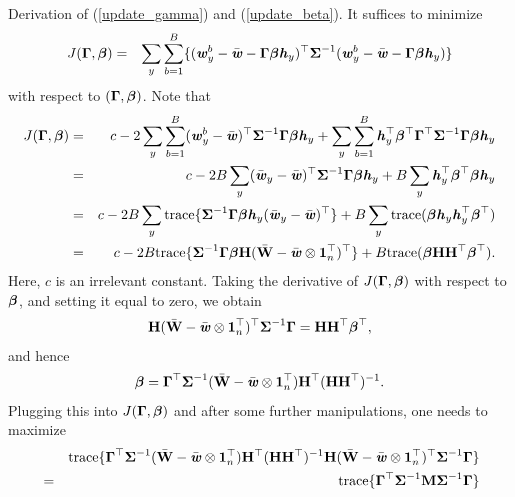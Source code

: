 \documentclass[12pt]{article}
\def \bfith{\mbox{\textbf{\textit{h}}}}
\def \bfitw{\mbox{\textbf{\textit{w}}}}
\def \bfbeta{\mbox{\boldmath $\beta$}}
\def \M{\mathbf{M}}
\def \H{\mathbf{H}}
\def \W{\mathbf{W}}
\def \bfGamma{\mbox{\boldmath $\Gamma$}}
\def \bfSigma{\mbox{\boldmath $\Sigma$}}
\begin{document}
{\sc Derivation of (\ref{update_gamma}) and (\ref{update_beta}).} It suffices to minimize
\begin{eqnarray*}
J(\bfGamma, \bfbeta) &=& \sum_{y} \sum_{b = 1}^{B}\{(\bfitw_{y}^{b} - \bar{\bfitw} - \bfGamma{\bfbeta} \bfith_y)^{\top} \bfSigma^{-1} (\bfitw_{y}^{b} - \bar{\bfitw} - \bfGamma {\bfbeta} \bfith_y)\}
\end{eqnarray*}
with respect to $(\bfGamma, \bfbeta)$. Note that
\begin{eqnarray*}
J(\bfGamma, \bfbeta) &=& c - 2 \sum_{y} \sum_{b = 1}^{B} (\bfitw_{y}^{b} - \bar{\bfitw})^{\top} \bfSigma^{-1} \bfGamma {\bfbeta} \bfith_y + \sum_{y} \sum_{b = 1}^{B} \bfith_y^{\top} {\bfbeta}^{\top} \bfGamma^{\top} \bfSigma^{-1} \bfGamma \bfbeta \bfith_y \\
&=& c - 2 B \sum_{y} (\bar{\bfitw}_{y} - \bar{\bfitw})^{\top} \bfSigma^{-1} \bfGamma {\bfbeta} \bfith_y + B \sum_{y} \bfith_y^{\top} {\bfbeta}^{\top} \bfbeta \bfith_y \\
&=& c - 2 B \sum_{y} {\operatorname{trace}}\{\bfSigma^{-1} \bfGamma {\bfbeta} \bfith_y (\bar{\bfitw}_{y} - \bar{\bfitw})^{\top}\} + B \sum_{y} {\operatorname{trace}}(\bfbeta \bfith_y \bfith_y^{\top} {\bfbeta}^{\top}) \\
&=& c - 2 B {\operatorname{trace}}\{\bfSigma^{-1} \bfGamma {\bfbeta} \H (\bar{\W} - \bar{\bfitw} \otimes {\bf 1}_n^{\top})^{\top}\} + B  {\operatorname{trace}}(\bfbeta \H\H^{\top} {\bfbeta}^{\top}).
\end{eqnarray*}
Here, $c$ is an irrelevant constant. Taking the derivative of $J(\bfGamma, \bfbeta)$ with respect to $\bfbeta$, and setting it equal to zero, we obtain
\begin{eqnarray*}
\H (\bar{\W} - \bar{\bfitw} \otimes {\bf 1}_n^{\top})^{\top} \bfSigma^{-1} \bfGamma = \H\H^{\top} \bfbeta^{\top},
\end{eqnarray*}
and hence
\begin{eqnarray*}
{\bfbeta} = \bfGamma^{\top}\bfSigma^{-1} (\bar{\W} - \bar{\bfitw} \otimes {\bf 1}_n^{\top}) \H^{\top} (\H\H^{\top})^{-1}.
\end{eqnarray*}
Plugging this into $J(\bfGamma, \bfbeta)$ and after some further manipulations, one needs to maximize
\begin{eqnarray*}
&& {\operatorname{trace}}\{\bfGamma^{\top}\bfSigma^{-1} (\bar{\W} - \bar{\bfitw} \otimes {\bf 1}_n^{\top}) \H^{\top} (\H\H^{\top})^{-1} \H (\bar{\W} - \bar{\bfitw} \otimes {\bf 1}_n^{\top})^{\top} \bfSigma^{-1}\bfGamma\} \\ &=& {\operatorname{trace}}\{\bfGamma^{\top}\bfSigma^{-1} \M \bfSigma^{-1}\bfGamma\}
\end{eqnarray*}
\end{document}
